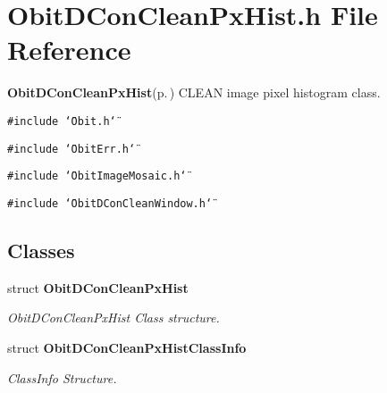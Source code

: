 \section{Obit\-DCon\-Clean\-Px\-Hist.h File Reference}
\label{ObitDConCleanPxHist_8h}
{\bf Obit\-DCon\-Clean\-Px\-Hist}{\rm (p.\,\pageref{structObitDConCleanPxHist})} CLEAN image pixel histogram class. 

{\tt \#include \char`\"{}Obit.h\char`\"{}}\par
{\tt \#include \char`\"{}Obit\-Err.h\char`\"{}}\par
{\tt \#include \char`\"{}Obit\-Image\-Mosaic.h\char`\"{}}\par
{\tt \#include \char`\"{}Obit\-DCon\-Clean\-Window.h\char`\"{}}\par
\subsection*{Classes}
\begin{CompactItemize}
\item 
struct {\bf Obit\-DCon\-Clean\-Px\-Hist}
\begin{CompactList}\small\item\em Obit\-DCon\-Clean\-Px\-Hist Class structure. \item\end{CompactList}\item 
struct {\bf Obit\-DCon\-Clean\-Px\-Hist\-Class\-Info}
\begin{CompactList}\small\item\em Class\-Info Structure. \item\end{CompactList}\end{CompactItemize}
